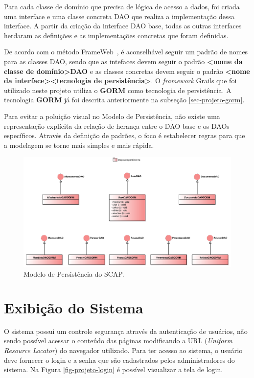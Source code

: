 Para cada classe de domínio que precisa de lógica de acesso a dados, foi criada uma interface e uma classe concreta DAO que realiza a implementação dessa interface. A partir da criação da interface DAO base, todas as outras interfaces herdaram as definições e as implementações concretas que foram definidas.

De acordo com o método FrameWeb~\cite{souza:masterthesis07,souza-celebratingfalbo20}, é aconselhável seguir um padrão de nomes para as classes DAO, sendo que as intefaces devem seguir o padrão \textbf{<nome da classe de domínio>DAO} e as classes concretas devem seguir o padrão \textbf{<nome da interface><tecnologia de persistência>}. O \textit{framework} Grails que foi utilizado neste projeto utiliza o \textbf{GORM} como tecnologia de persistência. A tecnologia \textbf{GORM} já foi descrita anteriormente na subseção \ref{sec-projeto-gorm}.

Para evitar a poluição visual no Modelo de Persistência, não existe uma representação explícita da relação de herança entre o DAO base e os DAOs específicos. Através da definição de padrões, o foco é estabelecer regras para que a modelagem se torne mais simples e mais rápida.    

\begin{figure}[h]
	\centering
	\includegraphics[scale=0.4]{figuras/fig-projeto-persistencia} 
	\caption{Modelo de Persistência do SCAP.}
	\label{fig-projeto-persistencia}
\end{figure}

\section{Exibição do Sistema}
\label{sec-projeto-exibicao-sistema}

O sistema possui um controle segurança através da autenticação de usuários, não sendo possível acessar o conteúdo das páginas modificando a URL (\textit{Uniform Resource Locator}) do navegador utilizado. Para ter acesso ao sistema, o usuário deve fornecer o login e a senha que são cadastrados pelos administradores do sistema. Na Figura \ref{fig-projeto-login} é possível visualizar a tela de login.   

